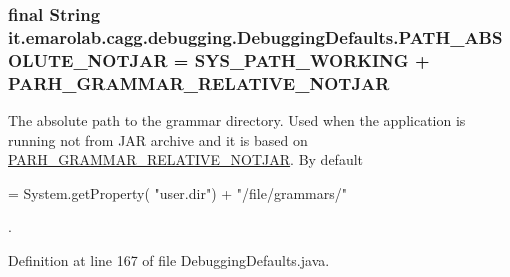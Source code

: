 \hypertarget{classit_1_1emarolab_1_1cagg_1_1debugging_1_1DebuggingDefaults_ab6020d09c49f55a681ceb6a14c47e4d3}{
\subsubsection[{P\-A\-T\-H\-\_\-\-A\-B\-S\-O\-L\-U\-T\-E\-\_\-\-N\-O\-T\-J\-A\-R}]{\setlength{\rightskip}{0pt plus 5cm}final String it.\-emarolab.\-cagg.\-debugging.\-Debugging\-Defaults.\-P\-A\-T\-H\-\_\-\-A\-B\-S\-O\-L\-U\-T\-E\-\_\-\-N\-O\-T\-J\-A\-R = {\bf S\-Y\-S\-\_\-\-P\-A\-T\-H\-\_\-\-W\-O\-R\-K\-I\-N\-G} + {\bf P\-A\-R\-H\-\_\-\-G\-R\-A\-M\-M\-A\-R\-\_\-\-R\-E\-L\-A\-T\-I\-V\-E\-\_\-\-N\-O\-T\-J\-A\-R}\hspace{0.3cm}{\ttfamily [static]}}}\label{classit_1_1emarolab_1_1cagg_1_1debugging_1_1DebuggingDefaults_ab6020d09c49f55a681ceb6a14c47e4d3}
The absolute path to the grammar directory. Used when the application is running not from J\-A\-R archive and it is based on \hyperlink{classit_1_1emarolab_1_1cagg_1_1debugging_1_1DebuggingDefaults_a325c9fa4713048139bba6cf3ec933424}{P\-A\-R\-H\-\_\-\-G\-R\-A\-M\-M\-A\-R\-\_\-\-R\-E\-L\-A\-T\-I\-V\-E\-\_\-\-N\-O\-T\-J\-A\-R}. By default
\begin{DoxyCode}
= System.getProperty( \textcolor{stringliteral}{"user.dir"}) + \textcolor{stringliteral}{"/file/grammars/"} 
\end{DoxyCode}
 . 

Definition at line 167 of file Debugging\-Defaults.\-java.

